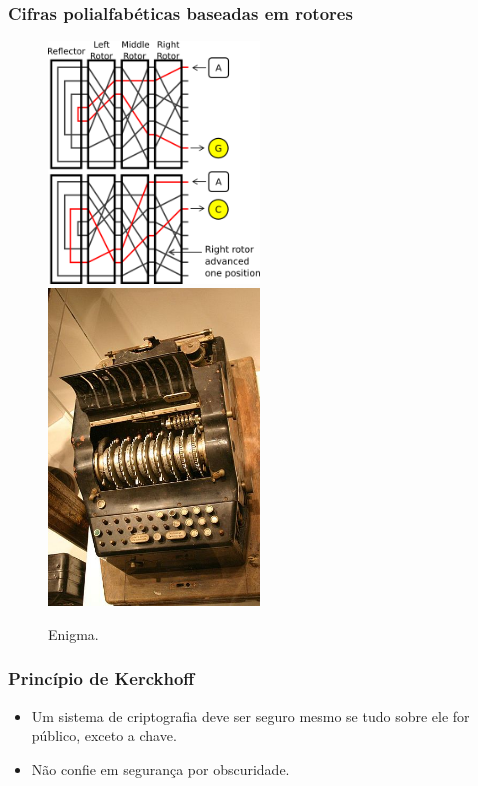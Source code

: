 \begin{frame}
\frametitle{Cifras polialfabéticas baseadas em rotores}
\scriptsize
\begin{figure}[h]
\centering
\includegraphics[width=0.5\textwidth,height=0.5\textheight,keepaspectratio]{figures/enigmaaction.png}
\includegraphics[width=0.5\textwidth,height=0.5\textheight,keepaspectratio]{figures/enigma.jpg}
\caption{Enigma.}
\label{fig-enigma}
\end{figure}
\vspace{-3ex}
\end{frame}



\begin{frame}
\frametitle{Princípio de Kerckhoff}
\begin{itemize}
\item Um sistema de criptografia deve ser seguro mesmo se tudo sobre ele for público, exceto a chave.
\item Não confie em segurança por obscuridade.
\end{itemize}
\end{frame}

